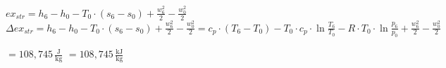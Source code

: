 \( ex_{str} = h_6 - h_0 - T_0 \cdot (s_6 - s_0) + \frac{w_6^2}{2} - \frac{w_0^2}{2} \)  
\( \Delta ex_{str} = h_6 - h_0 - T_0 \cdot (s_6 - s_0) + \frac{w_6^2}{2} - \frac{w_0^2}{2} = c_p \cdot (T_6 - T_0) - T_0 \cdot c_p \cdot \ln \frac{T_6}{T_0} - R \cdot T_0 \cdot \ln \frac{p_6}{p_0} + \frac{w_6^2}{2} - \frac{w_0^2}{2} \)  

\( = 108,745 \, \frac{\text{J}}{\text{kg}} \)  
\( = 108,745 \, \frac{\text{kJ}}{\text{kg}} \)